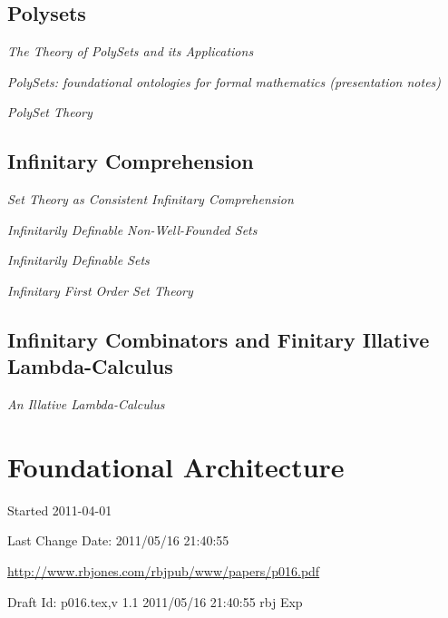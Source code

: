 \documentclass[10pt,titlepage]{book}
\begin{document}
\subsection{Polysets}

\emph{The Theory of PolySets and its Applications}\cite{jones06a}

\emph{PolySets: foundational ontologies for formal mathematics (presentation notes)}\cite{rbjn003}\cite{rbjo003}

\emph{PolySet Theory}\cite{rbj020}

\subsection{Infinitary Comprehension}

\emph{Set Theory as Consistent Infinitary Comprehension}\cite{rbjt021}

\emph{Infinitarily Definable Non-Well-Founded Sets}\cite{rbjt024}

\emph{Infinitarily Definable Sets}\cite{rbjt026}

\emph{Infinitary First Order Set Theory}\cite{rbjt027}

\subsection{Infinitary Combinators and Finitary Illative Lambda-Calculus}

\emph{An Illative Lambda-Calculus}\cite{rbjt041}

\section{Foundational Architecture}


\backmatter

%




\label{index}
{\twocolumn[]
{\small\printindex}}

\vfill

\tiny{
Started 2011-04-01

Last Change $ $Date: 2011/05/16 21:40:55 $ $

\href{http://www.rbjones.com/rbjpub/www/papers/p016.pdf}{http://www.rbjones.com/rbjpub/www/papers/p016.pdf}

Draft $ $Id: p016.tex,v 1.1 2011/05/16 21:40:55 rbj Exp $ $
}%
\end{document}
